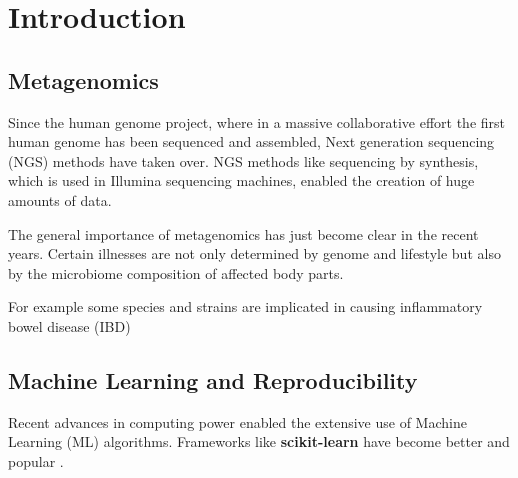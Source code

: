 
\chapter{Introduction} %

\label{introduction} %


\newcommand{\keyword}[1]{\textbf{#1}}
\newcommand{\tabhead}[1]{\textbf{#1}}
\newcommand{\code}[1]{{\sethlcolor{lightgray}\hl{\texttt{#1}}}}
\newcommand{\file}[1]{\texttt{\bfseries#1}}
\newcommand{\option}[1]{\texttt{\itshape#1}}



\section{Metagenomics}

Since the human genome project, where in a massive collaborative effort the first human genome has been sequenced and assembled, Next generation sequencing (NGS) methods have taken over. 
NGS methods like sequencing by synthesis, which is used in Illumina sequencing machines, enabled the creation of huge amounts of data. 

The general importance of metagenomics has just become clear in the recent years. 
Certain illnesses are not only determined by genome and lifestyle but also by the microbiome composition of affected body parts. %

For example some species and strains are implicated in causing inflammatory bowel disease (IBD) %



\section{Machine Learning and Reproducibility}

Recent advances in computing power enabled the extensive use of Machine Learning (ML) algorithms. 
Frameworks like \keyword{scikit-learn} have become better and popular \citep{scikit}.

